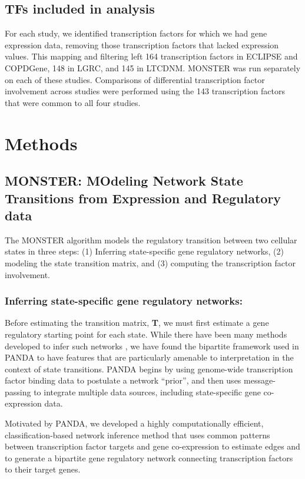 \subsection*{TFs included in analysis} For each study, we identified transcription factors for which we had gene expression data, removing those transcription factors that lacked expression values. This mapping and filtering left 164 transcription factors in ECLIPSE and COPDGene, 148 in LGRC, and 145 in LTCDNM. MONSTER was run separately on each of these studies. Comparisons of differential transcription factor involvement across studies were performed using the 143 transcription factors that were common to all four studies.

\section*{Methods}

\subsection*{MONSTER: MOdeling Network State Transitions from Expression and Regulatory data}

The MONSTER algorithm models the regulatory transition between two cellular states in three  steps: (1) Inferring state-specific gene regulatory networks, (2) modeling the state transition matrix, and (3) computing the transcription factor involvement.

\subsubsection*{Inferring state-specific gene regulatory networks:} Before estimating the transition matrix, \textbf{T}, we must first estimate a gene regulatory starting point for each state. While there have been many methods developed to infer such networks \cite{hill2012bayesian, glass2014sexually, glass2015network, eduati2012integrating, chen2009input, molinelli2013perturbation, saez2011comparing}, we have found the bipartite framework used in PANDA \cite{glass2013passing} to have features that are particularly amenable to interpretation in the context of state transitions. PANDA begins by using genome-wide transcription factor binding data to postulate a network ``prior'', and then uses message-passing  to integrate multiple data sources, including state-specific gene co-expression data. 

Motivated by PANDA, we developed a highly computationally efficient, classification-based network inference method that uses common patterns between transcription factor targets and gene co-expression to estimate edges and to generate a bipartite gene regulatory network connecting transcription factors to their target genes.

